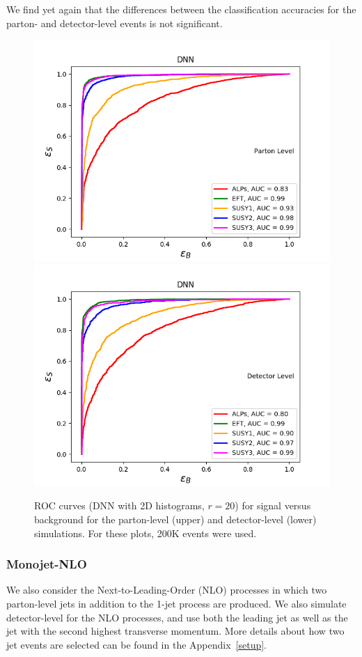 \documentclass[prd,aps,letterpaper,floatfix,superscriptaddress,preprintnumbers,twocolumn,10pt,nofootinbib]{revtex4-1}
\begin{document}
We find yet again that the differences between the classification accuracies for the parton- and detector-level events is not significant. 

\begin{figure}%
\centering
\includegraphics[scale=0.50]{figures/2D_DNN_sig_vs_bg_LO_ROC.png}
\includegraphics[scale=0.50]{figures/2D_DNN_sig_vs_bg_delphes_ROC.png}
\caption{ROC curves (DNN with 2D histograms, $r = 20$) for signal versus background for the parton-level (upper) and detector-level (lower) simulations. For these plots, 200K events were used.}\label{2D_DNN_sig_vs_bg_LO_ROC}
\end{figure}


\subsubsection{Monojet-NLO}
We also consider the Next-to-Leading-Order (NLO) processes in which two parton-level jets in addition to the 1-jet process are produced. We also simulate detector-level for the NLO processes, and use both the leading jet as well as the jet with the second highest transverse momentum. More details about how two jet events are selected can be found in the Appendix~\ref{setup}. 
\end{document}
